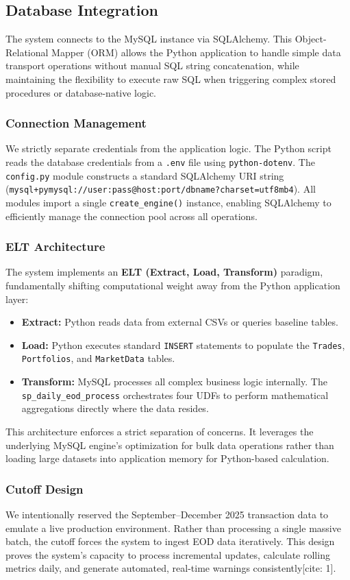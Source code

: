 \subsection{Database Integration}
The system connects to the MySQL instance via SQLAlchemy. This Object-Relational Mapper (ORM) allows the Python application to handle simple data transport operations without manual SQL string concatenation, while maintaining the flexibility to execute raw SQL when triggering complex stored procedures or database-native logic.

\subsubsection{Connection Management}
We strictly separate credentials from the application logic. The Python script reads the database credentials from a \texttt{.env} file using \texttt{python-dotenv}. The \texttt{config.py} module constructs a standard SQLAlchemy URI string (\texttt{mysql+pymysql://user:pass@host:port/dbname?charset=utf8mb4}). All modules import a single \texttt{create\_engine()} instance, enabling SQLAlchemy to efficiently manage the connection pool across all operations.

\subsubsection{ELT Architecture}
The system implements an \textbf{ELT (Extract, Load, Transform)} paradigm, fundamentally shifting computational weight away from the Python application layer:
\begin{itemize}
    \item \textbf{Extract:} Python reads data from external CSVs or queries baseline tables.
    \item \textbf{Load:} Python executes standard \texttt{INSERT} statements to populate the \texttt{Trades}, \texttt{Portfolios}, and \texttt{MarketData} tables.
    \item \textbf{Transform:} MySQL processes all complex business logic internally. The \texttt{sp\_daily\_eod\_process} orchestrates four UDFs to perform mathematical aggregations directly where the data resides.
\end{itemize}
This architecture enforces a strict separation of concerns. It leverages the underlying MySQL engine's optimization for bulk data operations rather than loading large datasets into application memory for Python-based calculation.

\subsubsection{Cutoff Design}
We intentionally reserved the September–December 2025 transaction data to emulate a live production environment. Rather than processing a single massive batch, the cutoff forces the system to ingest EOD data iteratively. This design proves the system's capacity to process incremental updates, calculate rolling metrics daily, and generate automated, real-time warnings consistently[cite: 1].

